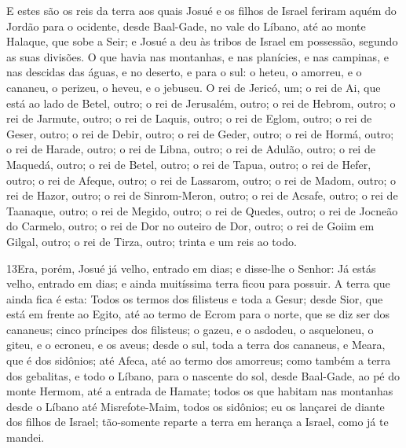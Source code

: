 E estes são os reis da terra aos quais Josué e os filhos de Israel
feriram aquém do Jordão para o ocidente, desde Baal-Gade, no vale do
Líbano, até ao monte Halaque, que sobe a Seir; e Josué a deu às
tribos de Israel em possessão, segundo as suas divisões. O que
havia nas montanhas, e nas planícies, e nas campinas, e nas descidas
das águas, e no deserto, e para o sul: o heteu, o amorreu, e o
cananeu, o perizeu, o heveu, e o jebuseu. O rei de Jericó, um; o
rei de Ai, que está ao lado de Betel, outro; o rei de
Jerusalém, outro; o rei de Hebrom, outro; o rei de Jarmute,
outro; o rei de Laquis, outro; o rei de Eglom, outro; o rei
de Geser, outro; o rei de Debir, outro; o rei de Geder,
outro; o rei de Hormá, outro; o rei de Harade, outro;
o rei de Libna, outro; o rei de Adulão, outro; o rei
de Maquedá, outro; o rei de Betel, outro; o rei de Tapua,
outro; o rei de Hefer, outro; o rei de Afeque, outro; o rei
de Lassarom, outro; o rei de Madom, outro; o rei de Hazor,
outro; o rei de Sinrom-Meron, outro; o rei de Acsafe, outro;
o rei de Taanaque, outro; o rei de Megido, outro; o
rei de Quedes, outro; o rei de Jocneão do Carmelo, outro; o
rei de Dor no outeiro de Dor, outro; o rei de Goiim em Gilgal,
outro; o rei de Tirza, outro; trinta e um reis ao todo.

\medskip

\lettrine{13} Era, porém, Josué já velho, entrado em dias; e
disse-lhe o Senhor: Já estás velho, entrado em dias; e ainda
muitíssima terra ficou para possuir. A terra que ainda fica é
esta: Todos os termos dos filisteus e toda a Gesur; desde Sior,
que está em frente ao Egito, até ao termo de Ecrom para o norte, que
se diz ser dos cananeus; cinco príncipes dos filisteus; o gazeu, e o
asdodeu, o asqueloneu, o giteu, e o ecroneu, e os aveus; desde o
sul, toda a terra dos cananeus, e Meara, que é dos sidônios; até
Afeca, até ao termo dos amorreus; como também a terra dos
gebalitas, e todo o Líbano, para o nascente do sol, desde Baal-Gade,
ao pé do monte Hermom, até a entrada de Hamate; todos os que
habitam nas montanhas desde o Líbano até Misrefote-Maim, todos os
sidônios; eu os lançarei de diante dos filhos de Israel; tão-somente
reparte a terra em herança a Israel, como já te mandei.

